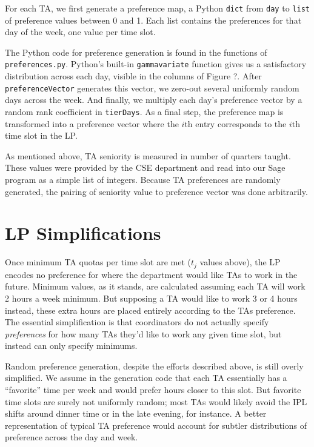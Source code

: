 \documentclass{article}
\begin{document}
\begin{multicols}{2}
For each TA, we first generate a preference map, a Python \texttt{dict} from \texttt{day} to \texttt{list} of preference values between 0 and 1. Each list contains the preferences for that day of the week, one value per time slot.

The Python code for preference generation is found in the functions of \texttt{preferences.py}. Python's built-in \texttt{gammavariate} function gives us a satisfactory distribution across each day, visible in the columns of Figure ?. After \texttt{preferenceVector} generates this vector, we zero-out several uniformly random days across the week. And finally, we multiply each day's preference vector by a random rank coefficient in \texttt{tierDays}. As a final step, the preference map is transformed into a preference vector where the $i$th entry corresponds to the $i$th time slot in the LP.

As mentioned above, TA seniority is measured in number of quarters taught. These values were provided by the CSE department and read into our Sage program as a simple list of integers. Because TA preferences are randomly generated, the pairing of seniority value to preference vector was done arbitrarily.

\section*{LP Simplifications}

Once minimum TA quotas per time slot are met ($t_j$ values above), the LP encodes no preference for where the department would like TAs to work in the future. Minimum values, as it stands, are calculated assuming each TA will work 2 hours a week minimum. But supposing a TA would like to work 3 or 4 hours instead, these extra hours are placed entirely according to the TAs preference. The essential simplification is that coordinators do not actually specify \textit{preferences} for how many TAs they'd like to work any given time slot, but instead can only specify minimums.

Random preference generation, despite the efforts described above, is still overly simplified. We assume in the generation code that each TA essentially has a ``favorite'' time per week and would prefer hours closer to this slot. But favorite time slots are surely not uniformly random; most TAs would likely avoid the IPL shifts around dinner time or in the late evening, for instance. A better representation of typical TA preference would account for subtler distributions of preference across the day and week.


\end{multicols}
\end{document}
